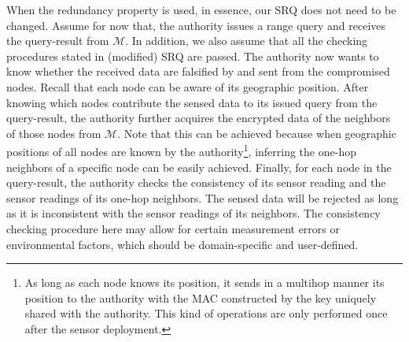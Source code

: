 \documentclass[conference]{IEEEtran}
\begin{document}
When the redundancy property is used, in essence, our SRQ does not need to be changed. Assume for now that, the authority issues a range query and receives the query-result from $\mathcal{M}$. In addition, we also assume that all the checking procedures stated in (modified) SRQ are passed. The authority now wants to know whether the received data are falsified by and sent from the compromised nodes. Recall that each node can be aware of its geographic position. After knowing which nodes contribute the sensed data to its issued query from the query-result, the authority further acquires the encrypted data of the neighbors of those nodes from $\mathcal{M}$. Note that this can be achieved because when geographic positions of all nodes are known by the authority\footnote{As long as each node knows its position, it sends in a multihop manner its position to the authority with the MAC constructed by the key uniquely shared with the authority. This kind of operations are only performed once after the sensor deployment.}, inferring the one-hop neighbors of a specific node can be easily achieved. Finally, for each node in the query-result, the authority checks the consistency of its sensor reading and the sensor readings of its one-hop neighbors. The sensed data will be rejected as long as it is inconsistent with the sensor readings of its neighbors. The consistency checking procedure here may allow for certain measurement errors or environmental factors, which should be domain-specific and user-defined. 
\end{document}
